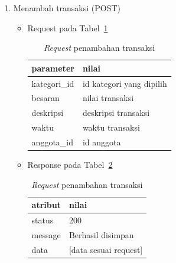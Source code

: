 \begin{enumerate}
		\item Menambah transaksi (POST)
		\begin{itemize}
			\item Request pada Tabel~\ref{tab:request_tambah_transaksi}
				\begin{table}[h]
					\centering
						\begin{tabular}{ |p{4cm}|p{10cm}|}
							\hline
							parameter & nilai \\ \hline
							kategori\_id & id kategori yang dipilih \\ \hline
							besaran & nilai transaksi \\ \hline
							deskripsi & deskripsi transaksi \\ \hline
							waktu & waktu transaksi \\ \hline
							anggota\_id & id anggota \\ \hline
					\end{tabular}
					\caption{\textit{Request} penambahan transaksi}
					\label{tab:request_tambah_transaksi}
				\end{table}
			\item Response pada Tabel~\ref{tab:response_tambah_transaksi}
				\begin{table}[h]
					\centering
						\begin{tabular}{ |p{4cm}|p{10cm}|}
							\hline
							atribut & nilai \\ \hline
							status & 200\\ \hline
							message & Berhasil disimpan \\ \hline
							data & [data sesuai request] \\ \hline
						\end{tabular}
						\caption{\textit{Request} penambahan transaksi}
					\label{tab:response_tambah_transaksi}
				\end{table}
		\end{itemize}
		

\end{enumerate}
